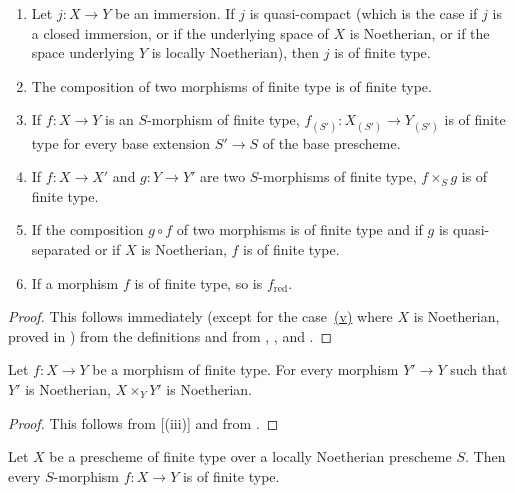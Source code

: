 \begin{proposition}[1.5.4]
\label{IV.1.5.4}
\begin{enumerate}
  \item[\rm(i)] Let $j:X\to Y$ be an immersion.
  If $j$ is quasi-compact (which is the case if $j$ is a closed immersion, or if the underlying space of $X$ is Noetherian, or if the space underlying $Y$ is locally Noetherian), then $j$ is of finite type.
  \item[\rm(ii)] The composition of two morphisms of finite type is of finite type.
  \item[\rm(iii)] If $f:X\to Y$ is an $S$-morphism of finite type, $f_{(S')}:X_{(S')}\to Y_{(S')}$ is of finite type for every base extension $S'\to S$ of the base prescheme.
  \item[\rm(iv)] If $f:X\to X'$ and $g:Y\to Y'$ are two $S$-morphisms of finite type, $f\times_S g$ is of finite type.
  \item[\rm(v)] If the composition $g\circ f$ of two morphisms is of finite type and if $g$ is quasi-separated or if $X$ is Noetherian, $f$ is of finite type.
  \item[\rm(vi)] If a morphism $f$ is of finite type, so is $f_{\mathrm{red}}$.
\end{enumerate}
\end{proposition}

\begin{proof}
This follows immediately (except for the case~{\hyperlink{ega4.c04.prop.1-5-4}{(v)}} where $X$ is Noetherian, proved in ) from the definitions and from , , and .
\end{proof}

\begin{corollary}[1.5.5]
\label{IV.1.5.5}
Let $f:X\to Y$ be a morphism of finite type.
For every morphism $Y'\to Y$ such that $Y'$ is Noetherian, $X\times_Y Y'$ is Noetherian.
\end{corollary}

\begin{proof}
This follows from [(iii)] and from .
\end{proof}

\begin{corollary}[1.5.6]
\label{IV.1.5.6}
Let $X$ be a prescheme of finite type over a locally Noetherian prescheme $S$.
Then every $S$-morphism $f:X\to Y$ is of finite type.
\end{corollary}

